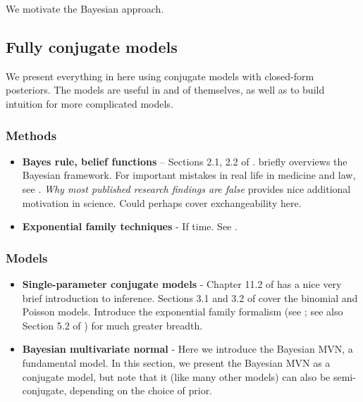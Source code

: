 \documentclass{article} %
\begin{document}
We motivate the Bayesian approach.

\subsection{Fully conjugate models}

We present everything in here using conjugate models with closed-form posteriors.  The models are useful in and of themselves,  as well as to build intuition for more complicated models.   

\subsubsection{Methods}
	\begin{itemize}
	\item \textbf{Bayes rule, belief functions} -- Sections 2.1,  2.2 of \cite{hoff2009first}.   \cite{ghahramani2013bayesian} briefly overviews the Bayesian framework.   For important mistakes in real life in medicine and law,  see \cite{guardianXXXXobscure}.  \textit{Why most published research findings are false} \cite{ioannidis2005most} provides nice additional motivation in science.    Could perhaps cover exchangeability here. 
	\item \textbf{Exponential family techniques} - If time.  See \cite{wojnowiczXXXXexponential}.
	\end{itemize}
\subsubsection{Models}
\begin{itemize}
	\item \textbf{Single-parameter conjugate models} - Chapter 11.2 of \cite{davison2003statistical} has a nice very brief introduction to inference.      Sections 3.1 and 3.2 of \cite{hoff2009first} cover the  binomial and Poisson models.   Introduce the exponential family formalism (see \cite{wojnowiczXXXXexponential};  see also Section 5.2 of \cite{davison2003statistical} ) for much greater breadth.  
	\item \textbf{Bayesian multivariate normal} -  Here we introduce the Bayesian MVN, a fundamental model. In this section, we present the Bayesian MVN as a conjugate model, but note that it (like many other models) can also be semi-conjugate,  depending on the choice of prior.
	\end{itemize}   

\end{document}
